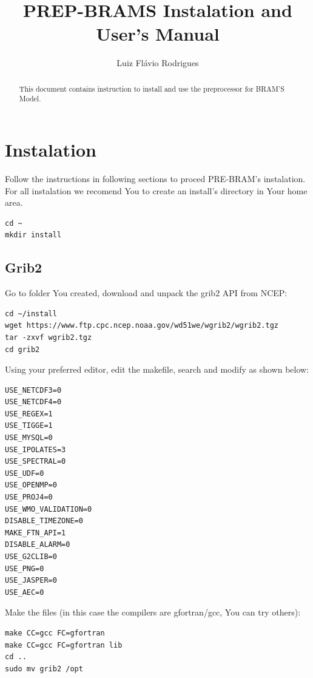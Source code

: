 \documentclass{article}
\begin{document}
\title{PREP-BRAMS Instalation  and User's Manual}
\author{Luiz Flávio Rodrigues}

\maketitle

\begin{abstract}
This document contains instruction to install and use the preprocessor for BRAM'S Model.
\end{abstract}

\section{Instalation}
Follow the instructions in following sections to proced PRE-BRAM's instalation. For all instalation we recomend You to create an install's directory in Your home area.

\begin{verbatim}
cd ~
mkdir install
\end{verbatim}

\subsection{Grib2}

Go to folder You created, download and unpack the grib2 API from NCEP:

\begin{verbatim}
cd ~/install
wget https://www.ftp.cpc.ncep.noaa.gov/wd51we/wgrib2/wgrib2.tgz
tar -zxvf wgrib2.tgz
cd grib2
\end{verbatim}

Using your preferred editor, edit the makefile, search and modify as shown below:

\begin{verbatim}
USE_NETCDF3=0     
USE_NETCDF4=0     
USE_REGEX=1     
USE_TIGGE=1     
USE_MYSQL=0     
USE_IPOLATES=3     
USE_SPECTRAL=0     
USE_UDF=0     
USE_OPENMP=0     
USE_PROJ4=0     
USE_WMO_VALIDATION=0     
DISABLE_TIMEZONE=0     
MAKE_FTN_API=1     
DISABLE_ALARM=0     
USE_G2CLIB=0     
USE_PNG=0     
USE_JASPER=0     
USE_AEC=0
\end{verbatim}

Make the files (in this case the compilers are gfortran/gcc, You can try others):

\begin{verbatim}
make CC=gcc FC=gfortran
make CC=gcc FC=gfortran lib
cd ..
sudo mv grib2 /opt
\end{verbatim}
\end{document}
